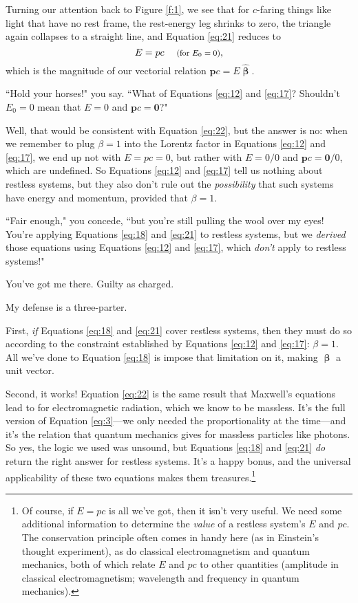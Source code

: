 \documentclass[12pt]{article}
\renewcommand{\vv}[1]{\mathbf{#1}}
\newcommand{\vvbeta}{\bm{\upbeta}}
\newcommand{\hatbeta}{\bm{\hat{\upbeta}}}
\begin{document}
Turning our attention back to Figure \ref{f:1}, we see that for $c$-faring things like light that have no rest frame, the rest-energy leg shrinks to zero, the triangle again collapses to a straight line, and Equation \ref{eq:21} reduces to
\begin{equation}\label{eq:22}
E=p c \quad \textrm{\footnotesize{ (for $E_0=0$)}},
\end{equation}
which is the magnitude of our vectorial relation $\vv p c = E \hatbeta$.

``Hold your horses!" you say. ``What of Equations \ref{eq:12} and \ref{eq:17}? Shouldn't $E_0 = 0$ mean that $E = 0$ and $\vv p c = \vv 0$?"

Well, that would be consistent with Equation \ref{eq:22}, but the answer is no: when we remember to plug $\beta = 1$ into the Lorentz factor in Equations \ref{eq:12} and \ref{eq:17}, we end up not with $E = p c = 0$, but rather with $E = 0/0$ and $\vv p c = \vv 0 / 0$, which are undefined. So Equations \ref{eq:12} and \ref{eq:17} tell us nothing about restless systems, but they also don't rule out the \emph{possibility} that such systems have energy and momentum, provided that $\beta = 1$.

``Fair enough," you concede, ``but you're still pulling the wool over my eyes! You're applying Equations \ref{eq:18} and \ref{eq:21} to restless systems, but we \emph{derived} those equations using Equations \ref{eq:12} and \ref{eq:17}, which \emph{don't} apply to restless systems!"

You've got me there. Guilty as charged.

My defense is a three-parter.

First, \emph{if} Equations \ref{eq:18} and \ref{eq:21} cover restless systems, then they must do so according to the constraint established by Equations \ref{eq:12} and \ref{eq:17}: $\beta = 1$. All we've done to Equation \ref{eq:18} is impose that limitation on it, making $\vvbeta$ a unit vector.

Second, it works! Equation \ref{eq:22} is the same result that Maxwell's equations lead to for electromagnetic radiation, which we know to be massless. It's the full version of Equation \ref{eq:3}---we only needed the proportionality at the time---and it's the relation that quantum mechanics gives for massless particles like photons. So yes, the logic we used was unsound, but Equations \ref{eq:18} and \ref{eq:21} \emph{do} return the right answer for restless systems. It's a happy bonus, and the universal applicability of these two equations makes them treasures.\footnote{Of course, if $E = p c$ is all we've got, then it isn't very useful. We need some additional information to determine the \emph{value} of a restless system's $E$ and $p c$. The conservation principle often comes in handy here (as in Einstein's thought experiment), as do classical electromagnetism and quantum mechanics, both of which relate $E$ and $p c$ to other quantities (amplitude in classical electromagnetism; wavelength and frequency in quantum mechanics).}
\end{document}
